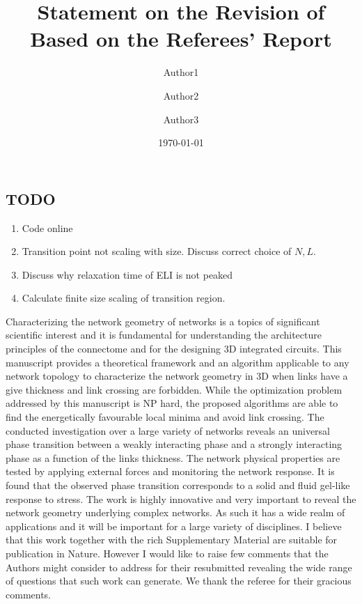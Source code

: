 \documentclass[11pt]{article}
\title{Statement on the Revision of \meta{Paper ID} \\
  Based on the Referees' Report}
\author{Author1 \and Author2 \and Author3}
\date{\today}
\newcommand\meta[1]{$\langle\hbox{#1}\rangle$}
\newcommand\PaperTitle[1]{``\textit{#1}''}
\begin{document}
\subsection*{TODO}

 \linespread{1}

\begin{enumerate}
    \item Code online
    \item Transition point not scaling with size. Discuss correct choice of $N,L$. 
    \item Discuss why relaxation time of ELI is not peaked
    \item Calculate finite size scaling of transition region. 
\end{enumerate}

 \linespread{1.5}

\begin{response}{
Characterizing the network geometry of networks is a topics of significant scientific interest and it is fundamental for understanding the architecture principles of the connectome and for the designing 3D integrated circuits. This manuscript provides a theoretical framework and an algorithm applicable to any network topology to characterize the network geometry in 3D when links have a give thickness and link crossing are forbidden.
While the optimization problem addressed by this manuscript is NP hard, the proposed algorithms are able to find the energetically favourable local minima and avoid link crossing. The conducted investigation over a large variety of networks reveals an universal phase transition between a weakly interacting phase and a strongly interacting phase as a function of the links thickness. The network physical properties are tested by applying external forces and monitoring the network response. It is found that the observed phase transition corresponds to a solid and fluid gel-like response to stress.
The work is highly innovative and very important to reveal the network geometry underlying complex networks. As such it has a wide realm of applications and it will be important for a large variety of disciplines. I believe that this work together with the rich Supplementary Material are suitable for publication in Nature.
However I would like to raise few comments that the Authors might consider to address for their resubmitted revealing the wide range of questions that such work can generate.
}
We thank the referee for their gracious comments. 

\end{response}
\end{document}
